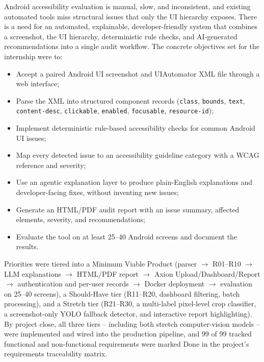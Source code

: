 \documentclass[10pt,conference]{IEEEtran}
\begin{document}
Android accessibility evaluation is manual, slow, and inconsistent, and existing automated tools miss structural issues that only the UI hierarchy exposes. There is a need for an automated, explainable, developer-friendly system that combines a screenshot, the UI hierarchy, deterministic rule checks, and AI-generated recommendations into a single audit workflow. The concrete objectives set for the internship were to:

\begin{itemize}
    \item Accept a paired Android UI screenshot and UIAutomator XML file through a web interface;
    \item Parse the XML into structured component records (\texttt{class}, \texttt{bounds}, \texttt{text}, \texttt{content-desc}, \texttt{clickable}, \texttt{enabled}, \texttt{focusable}, \texttt{resource-id});
    \item Implement deterministic rule-based accessibility checks for common Android UI issues;
    \item Map every detected issue to an accessibility guideline category with a WCAG reference and severity;
    \item Use an agentic explanation layer to produce plain-English explanations and developer-facing fixes, without inventing new issues;
    \item Generate an HTML/PDF audit report with an issue summary, affected elements, severity, and recommendations;
    \item Evaluate the tool on at least 25--40 Android screens and document the results.
\end{itemize}

Priorities were tiered into a Minimum Viable Product (parser $\rightarrow$ R01--R10 $\rightarrow$ LLM explanations $\rightarrow$ HTML/PDF report $\rightarrow$ Axion Upload/Dashboard/Report $\rightarrow$ authentication and per-user records $\rightarrow$ Docker deployment $\rightarrow$ evaluation on 25--40 screens), a Should-Have tier (R11--R20, dashboard filtering, batch processing), and a Stretch tier (R21--R30, a multi-label pixel-level crop classifier, a screenshot-only YOLO fallback detector, and interactive report highlighting). By project close, all three tiers -- including both stretch computer-vision models -- were implemented and wired into the production pipeline, and 99 of 99 tracked functional and non-functional requirements were marked Done in the project's requirements traceability matrix.
\end{document}
